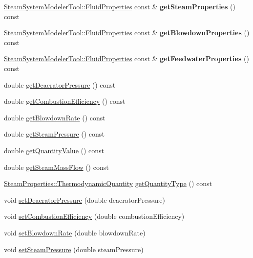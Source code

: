 \begin{DoxyCompactItemize}
\hyperlink{struct_steam_system_modeler_tool_1_1_fluid_properties}{Steam\+System\+Modeler\+Tool\+::\+Fluid\+Properties} const  \& {\bfseries get\+Steam\+Properties} () const
\item 
\mbox{\label{class_boiler_ac48aa3ee13845cdf388085e73531cb66}} 
\hyperlink{struct_steam_system_modeler_tool_1_1_fluid_properties}{Steam\+System\+Modeler\+Tool\+::\+Fluid\+Properties} const  \& {\bfseries get\+Blowdown\+Properties} () const
\item 
\mbox{\label{class_boiler_a03e09f9469c746789f302c42c8dfe959}} 
\hyperlink{struct_steam_system_modeler_tool_1_1_fluid_properties}{Steam\+System\+Modeler\+Tool\+::\+Fluid\+Properties} const  \& {\bfseries get\+Feedwater\+Properties} () const
\item 
double \hyperlink{class_boiler_aad4786e7b68084e65a35dd6235517b8c}{get\+Deaerator\+Pressure} () const
\item 
double \hyperlink{class_boiler_a21c7423b756761c3216704b3f554feff}{get\+Combustion\+Efficiency} () const
\item 
double \hyperlink{class_boiler_aec9bf6eeed82d8d5f35284c65a3986e7}{get\+Blowdown\+Rate} () const
\item 
double \hyperlink{class_boiler_a99d4bbace6ef20bcbdc4b0cfcdc43213}{get\+Steam\+Pressure} () const
\item 
double \hyperlink{class_boiler_a78370a174135e6cc95abcd3b7ac2f947}{get\+Quantity\+Value} () const
\item 
double \hyperlink{class_boiler_a4101e71234995558a451dcab145b5fc9}{get\+Steam\+Mass\+Flow} () const
\item 
\hyperlink{class_steam_properties_ae0294bedf7d178c2d8fb6aed0f62fbff}{Steam\+Properties\+::\+Thermodynamic\+Quantity} \hyperlink{class_boiler_a26a71f789c9f9e05bd43a1ca0219f920}{get\+Quantity\+Type} () const
\item 
void \hyperlink{class_boiler_a56f422254606ebba1248ae0b4f8f0215}{set\+Deaerator\+Pressure} (double deaerator\+Pressure)
\item 
void \hyperlink{class_boiler_abef6bc48101f98f0650cb07fb1d51f74}{set\+Combustion\+Efficiency} (double combustion\+Efficiency)
\item 
void \hyperlink{class_boiler_a66c0e4c577dbd3f52dcf202e69a08371}{set\+Blowdown\+Rate} (double blowdown\+Rate)
\item 
void \hyperlink{class_boiler_a0a4619ff73c9969daebe3aa66ddad6be}{set\+Steam\+Pressure} (double steam\+Pressure)

\end{DoxyCompactItemize}
